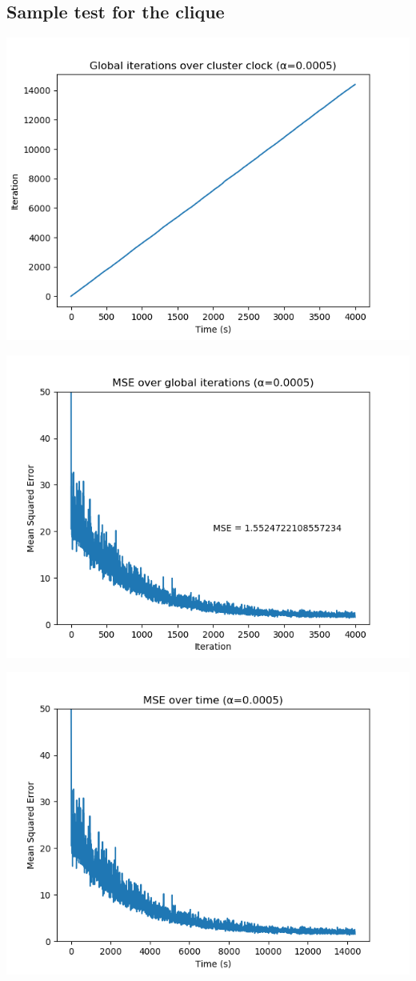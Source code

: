 \documentclass[a4paper,12pt]{article}
\theoremstyle{newplanestyle}
\theoremstyle{newdefinitionstyle}
\theoremstyle{newprovestyle}
\begin{document}
\subsection*{Sample test for the clique}
\includegraphics[scale=0.6]{iter_time_clique}

\includegraphics[scale=0.6]{mse_iter_clique}

\includegraphics[scale=0.6]{mse_time_clique}
\end{document}
